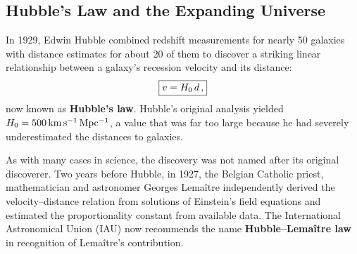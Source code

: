 \subsection{Hubble's Law and the Expanding Universe}

In 1929, Edwin Hubble combined redshift measurements for nearly 50 galaxies with distance estimates for about 20 of them to discover a striking linear relationship between a galaxy's recession velocity and its distance:
\begin{equation}
\boxed{v = H_0\, d\,,}
\label{eq:hubble_law}
\end{equation}
now known as \textbf{Hubble's law}. Hubble's original analysis yielded $H_0 = 500\,\mathrm{km\,s^{-1}\,Mpc^{-1}}$, a value that was far too large because he had severely underestimated the distances to galaxies.


As with many cases in science, the discovery was not named after its original discoverer. Two years before Hubble, in 1927, the Belgian Catholic priest, mathematician and astronomer Georges Lema\^{i}tre independently derived the velocity--distance relation from solutions of Einstein's field equations and estimated the proportionality constant from available data. The International Astronomical Union (IAU) now recommends the name \textbf{Hubble--Lema\^{i}tre law} in recognition of Lema\^{i}tre's contribution.


